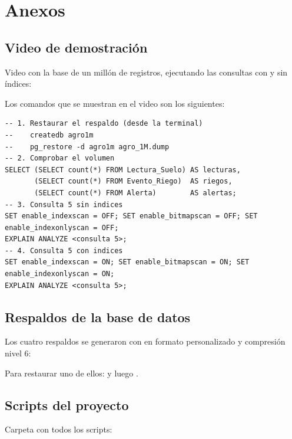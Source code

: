 \section{Anexos}

\subsection{Video de demostración}

Video con la base de un millón de registros, ejecutando las consultas con y sin índices: \enlaceVideo

Los comandos que se muestran en el video son los siguientes:

\begin{lstlisting}
-- 1. Restaurar el respaldo (desde la terminal)
--    createdb agro1m
--    pg_restore -d agro1m agro_1M.dump
-- 2. Comprobar el volumen
SELECT (SELECT count(*) FROM Lectura_Suelo) AS lecturas,
       (SELECT count(*) FROM Evento_Riego)  AS riegos,
       (SELECT count(*) FROM Alerta)        AS alertas;
-- 3. Consulta 5 sin indices
SET enable_indexscan = OFF; SET enable_bitmapscan = OFF; SET enable_indexonlyscan = OFF;
EXPLAIN ANALYZE <consulta 5>;
-- 4. Consulta 5 con indices
SET enable_indexscan = ON; SET enable_bitmapscan = ON; SET enable_indexonlyscan = ON;
EXPLAIN ANALYZE <consulta 5>;
\end{lstlisting}

\subsection{Respaldos de la base de datos}

Los cuatro respaldos se generaron con  en formato personalizado y compresión nivel 6: \enlaceDumps


Para restaurar uno de ellos:  y luego .

\subsection{Scripts del proyecto}

Carpeta con todos los scripts: \enlaceRepositorio

